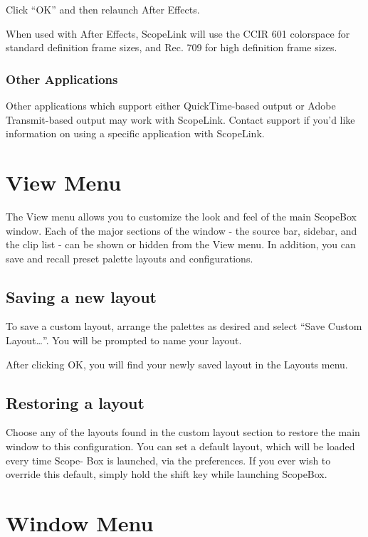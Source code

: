 \documentclass[10,letterpaper,]{report}
\begin{document}
Click ``OK'' and then relaunch After Effects.

When used with After Effects, ScopeLink will use the CCIR 601 colorspace
for standard definition frame sizes, and Rec. 709 for high definition
frame sizes.

\subsection{Other Applications}

Other applications which support either QuickTime-based output or Adobe
Transmit-based output may work with ScopeLink. Contact support if you'd
like information on using a specific application with ScopeLink.

\chapter{View Menu}

The View menu allows you to customize the look and feel of the main
ScopeBox window. Each of the major sections of the window - the source
bar, sidebar, and the clip list - can be shown or hidden from the View
menu. In addition, you can save and recall preset palette layouts and
configurations.

\section{Saving a new layout}

To save a custom layout, arrange the palettes as desired and select
``Save Custom Layout\ldots{}''. You will be prompted to name your
layout.

After clicking OK, you will find your newly saved layout in the Layouts
menu.

\section{Restoring a layout}

Choose any of the layouts found in the custom layout section to restore
the main window to this configuration. You can set a default layout,
which will be loaded every time Scope- Box is launched, via the
preferences. If you ever wish to override this default, simply hold the
shift key while launching ScopeBox.

\chapter{Window Menu}
\end{document}

